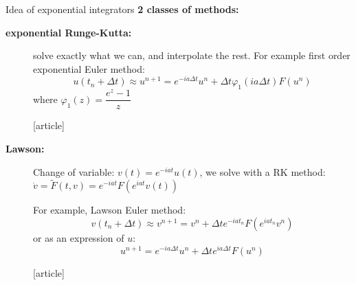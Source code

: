 \documentclass{beamer}
\newcommand{\customcite}[1]{\cite{#1}}
\begin{document}
\begin{frame}{Idea of exponential integrators}
  \textbf{\color{mblue} 2 classes of methods:}
  \begin{description}
    \item[\textbf{exponential Runge-Kutta:}] solve exactly what we can, and interpolate the rest. For example first order exponential Euler method:
      $$
        u(t_n+\Delta t) \approx u^{n+1} = e^{-ia\Delta t}u^n + \Delta t\varphi_1(ia\Delta t)F(u^n)
      $$
      where $\varphi_1(z) = \dfrac{e^z - 1}{z}$
      \vspace{-0.1cm}
      \begin{thebibliography}{9}
        [article]
         \customcite{Hochbruck:2010}
      \end{thebibliography}
    \item[\textbf{Lawson:}] Change of variable: $v(t)=e^{-iat}u(t)$, we solve with a RK method: $\dot{v} = \tilde{F}(t,v) = e^{-iat}F(e^{iat}v(t))$

      For example, Lawson Euler method:
      $$
        v(t_n+\Delta t)\approx v^{n+1} = v^n + \Delta t e^{-iat_n}F(e^{iat_n}v^n)
      $$
      or as an expression of $u$:
      $$
        u^{n+1} = e^{-ia\Delta t}u^n + \Delta te^{ia\Delta t}F(u^n)
      $$
      \vspace{-0.75cm}
      \begin{thebibliography}{9}
        [article]
         \customcite{Isherwood:2018}
      \end{thebibliography}
  \end{description}
\end{frame}
\end{document}
